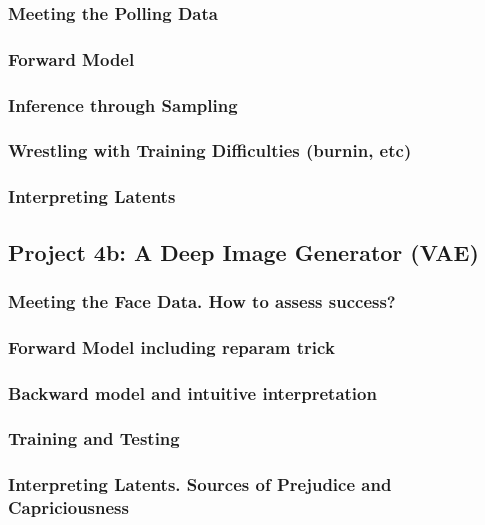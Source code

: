 \documentclass[12pt]{article}
\begin{document}
      \subsubsection*{Meeting the Polling Data}
      \subsubsection*{Forward Model}
      \subsubsection*{Inference through Sampling}
      \subsubsection*{Wrestling with Training Difficulties (burnin, etc)}
      \subsubsection*{Interpreting Latents}
    \newpage

    \subsection*{Project 4b: A Deep Image Generator (VAE)}
      \subsubsection*{Meeting the Face Data.  How to assess success?} %
      \subsubsection*{Forward Model including reparam trick}
      \subsubsection*{Backward model and intuitive interpretation}
      \subsubsection*{Training and Testing}
      \subsubsection*{Interpreting Latents.  Sources of Prejudice and Capriciousness}
    \newpage
\end{document}
